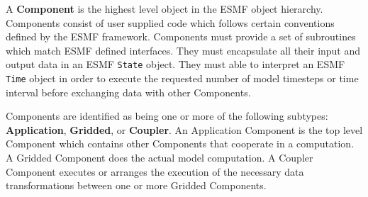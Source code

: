 %


A {\bf Component}
is the highest level object in the ESMF object
hierarchy.  Components consist of user supplied code
which follows certain conventions defined by the ESMF framework.
Components must provide a set of subroutines which match ESMF
defined interfaces. They must encapsulate
all their input and output data in an ESMF {\tt State} object.  They
must able to interpret an ESMF {\tt Time} object in order
to execute the requested number of model timesteps or time interval
before exchanging data with other Components.

Components are identified as being one or more of the
following subtypes: {\bf Application}, {\bf Gridded}, or {\bf Coupler}.
An Application Component is the top level Component which
contains other Components that cooperate in a computation. 
A Gridded Component
does the actual model computation.  A Coupler Component executes or
arranges the execution of the necessary data transformations between one
or more Gridded Components.


